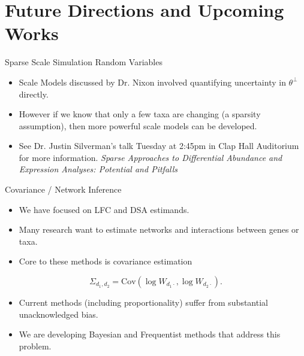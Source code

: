 \documentclass{beamer}
\begin{document}
\section{Future Directions and Upcoming Works}
\label{sec:orgd3bb6eb}
\begin{frame}[label={sec:org3871889}]{Sparse Scale Simulation Random Variables}
\begin{itemize}
\item Scale Models discussed by Dr. Nixon involved quantifying uncertainty in \(\theta^{\perp}\) directly.
\end{itemize}
\vfill
\begin{itemize}
\item However if we know that only a few taxa are changing (a sparsity assumption), then more powerful scale models can be developed.
\end{itemize}
\vfill
\begin{itemize}
\item See Dr. Justin Silverman's talk Tuesday at 2:45pm in Clap Hall Auditorium for more information. \textit{Sparse Approaches to Differential Abundance and Expression Analyses: Potential and Pitfalls}
\end{itemize}
\end{frame}
\begin{frame}[label={sec:orgbca61bb}]{Covariance / Network Inference}
\begin{itemize}
\item We have focused on LFC and DSA estimands.
\end{itemize}
\vfill
\begin{itemize}
\item Many research want to estimate networks and interactions between genes or taxa.
\end{itemize}
\vfill
\begin{itemize}
\item Core to these methods is covariance estimation
\end{itemize}
\[\Sigma_{d_{1}, d_{2}}=\text{Cov}(\log W_{d_{1} \cdot}, \log W_{d_{2} \cdot}).\]
\vfill
\begin{itemize}
\item Current methods (including proportionality) suffer from substantial unacknowledged bias.
\end{itemize}
\vfill
\begin{itemize}
\item We are developing Bayesian and Frequentist methods that address this problem.
\end{itemize}
\end{frame}
\end{document}
